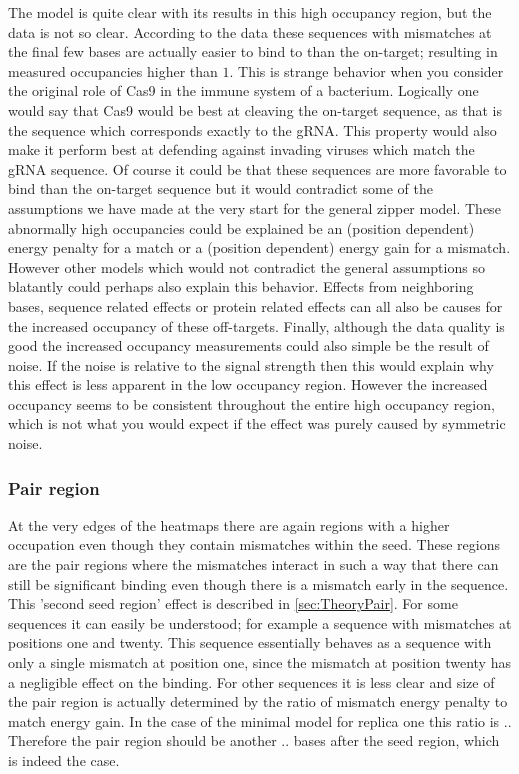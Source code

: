 The model is quite clear with its results in this high occupancy region, but the data is not so clear. According to the data these sequences with mismatches at the final few bases are actually easier to bind to than the on-target; resulting in measured occupancies higher than $1$. This is strange behavior when you consider the original role of Cas9 in the immune system of a bacterium. Logically one would say that Cas9 would be best at cleaving the on-target sequence, as that is the sequence which corresponds exactly to the gRNA. This property would also make it perform best at defending against invading viruses which match the gRNA sequence. Of course it could be that these sequences are more favorable to bind than the on-target sequence but it would contradict some of the assumptions we have made at the very start for the general zipper model. These abnormally high occupancies could be explained be an (position dependent) energy penalty for a match or a (position dependent) energy gain for a mismatch. However other models which would not contradict the general assumptions so blatantly could perhaps also explain this behavior. Effects from neighboring bases, sequence related effects or protein related effects can all also be causes for the increased occupancy of these off-targets. Finally, although the data quality is good %
the increased occupancy measurements could also simple be the result of noise. If the noise is relative to the signal strength then this would explain why this effect is less apparent in the low occupancy region. However the increased occupancy seems to be consistent throughout the entire high occupancy region, which is not what you would expect if the effect was purely caused by symmetric noise.

\subsubsection{Pair region}
At the very edges of the heatmaps there are again regions with a higher occupation even though they contain mismatches within the seed. These regions are the pair regions where the mismatches interact in such a way that there can still be significant binding even though there is a mismatch early in the sequence. This 'second seed region' effect is described in \ref{sec:TheoryPair}. For some sequences it can easily be understood; for example a sequence with mismatches at positions one and twenty. This sequence essentially behaves as a sequence with only a single mismatch at position one, since the mismatch at position twenty has a negligible effect on the binding. For other sequences it is less clear and size of the pair region is actually determined by the ratio of mismatch energy penalty to match energy gain. In the case of the minimal model for replica one this ratio is .. %
Therefore the pair region should be another .. bases after the seed region, which is indeed the case. %


